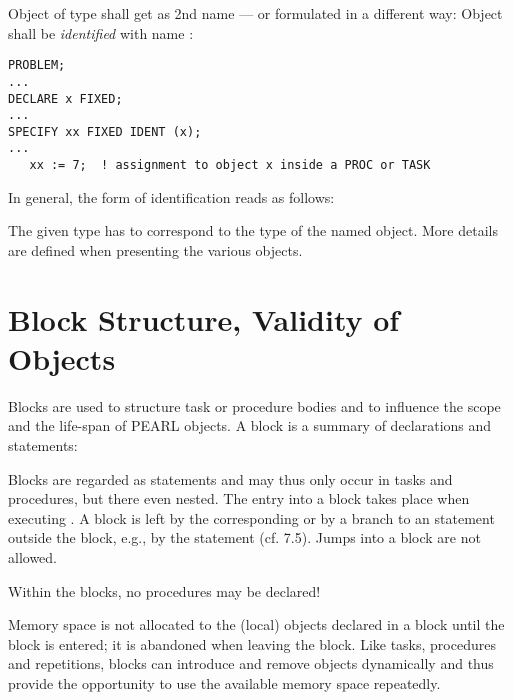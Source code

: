 Object  of type  shall get  as 2nd name
 --- or formulated in a different way:
 Object  shall be {\it identified} with name :

\begin{lstlisting}
PROBLEM;
...
DECLARE x FIXED;
...
SPECIFY xx FIXED IDENT (x);
...
   xx := 7;  ! assignment to object x inside a PROC or TASK
\end{lstlisting}
In general, the form of identification reads as follows:


\begin{grammarframe}



\end{grammarframe}

The given type has to correspond to the type of the named object. More
details are defined when presenting the various objects.

\section{Block Structure, Validity of Objects}   %
\label{sec_block}

Blocks are used to structure task or procedure bodies and to influence
the scope and the life-span of PEARL objects. A block is a summary of
declarations and statements:

\begin{grammarframe}

\end{grammarframe}

Blocks are regarded as statements and may thus only occur in tasks and
procedures, but there even nested. The entry into a block takes
place when executing . A block is left by the corresponding 
 or
by a branch to an statement outside the block, e.g., by the  
statement (cf. 7.5). Jumps into a block are not allowed.

Within the blocks, no procedures may be declared!

Memory space is not allocated to the (local) objects declared in a block
until the block is entered; it is abandoned when leaving the block. Like
tasks, procedures and repetitions, blocks can introduce and remove
objects dynamically and thus provide the opportunity to use the
available memory space repeatedly.

